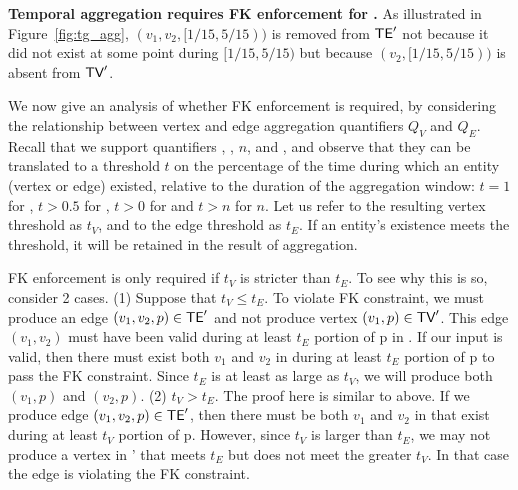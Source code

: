 {\bf Temporal aggregation requires FK enforcement for \tve.}  As
illustrated in Figure~\ref{fig:tg_agg}, $(v_1,v_2,[1/15,5/15))$ is
  removed from $\textsf{TE}'$ not because it did not exist at some point
  during $[1/15,5/15)$ but because $(v_2,[1/15,5/15))$ is absent from
      $\textsf{TV}'$.  

We now give an analysis of whether FK enforcement is required, by
considering the relationship between vertex and edge aggregation
quantifiers $Q_V$ and $Q_E$.  Recall that we support quantifiers
, ,  $n$, and ,
and observe that they can be translated to a threshold $t$ on the
percentage of the time during which an entity (vertex or edge)
existed, relative to the duration of the aggregation window: $t = 1$
for , $t > 0.5$ for , $t > 0$ for
 and $t > n$ for  $n$.  Let us refer to
the resulting vertex threshold as $t_V$, and to the edge threshold as
$t_E$.  If an entity's existence meets the threshold, it will be
retained in the result of aggregation.

FK enforcement is only required if $t_V$ is stricter than $t_E$.  To
see why this is so, consider 2 cases.  (1) Suppose that $t_V \leq
t_E$.  To violate FK constraint, we must produce an edge $(v_1, v_2,
p) \in \textsf{TE}'$ and not produce vertex $(v_1, p) \in \textsf{TV}'$.  This edge
$(v_1, v_2)$ must have been valid during at least $t_E$ portion of p
in \te.  If our input is valid, then there must exist both $v_1$ and
$v_2$ in \tv during at least $t_E$ portion of p to pass the FK
constraint.  Since $t_E$ is at least as large as $t_V$, we will
produce both $(v_1, p)$ and $(v_2, p)$.  (2) $t_V > t_E$.  The proof
here is similar to above.  If we produce edge $(v_1, v_2, p) \in
\textsf{TE}'$, then there must be both $v_1$ and $v_2$ in \tv that exist
during at least $t_V$ portion of p.  However, since $t_V$ is larger
than $t_E$, we may not produce a vertex in \tv' that meets $t_E$ but
does not meet the greater $t_V$.  In that case the edge is violating
the FK constraint.



